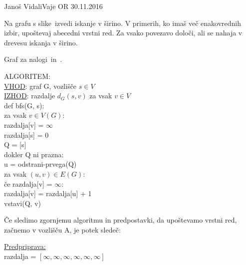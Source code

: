 
\begin{naloga}{Janoš Vidali}{Vaje OR 30.11.2016}
\begin{vprasanje}
Na grafu s slike~\fig izvedi iskanje v širino.
V primerih, ko imaš več ena\-ko\-vred\-nih izbir,
upoštevaj abecedni vrstni red.
Za vsako povezavo določi, ali se nahaja v drevesu iskanja v širino.

\begin{slika}
\pgfslika
\caption{Graf za nalogi~\nal in~\nal[dfs].}
\end{slika}
\end{vprasanje}

\begin{odgovor}
ALGORITEM:\\
\underline{VHOD}:  graf G, vozlišče $s \in V$\\
\underline{IZHOD}: razdalje $d_G(s, v)$ za vsak $v \in V$\\
def bfs(G, s):\\
	\phantom{x}\hspace{3ex}za vsak $v \in V(G)$:\\
		\phantom{x}\hspace{6ex}razdalja[v] = $\infty$\\
	\phantom{x}\hspace{3ex}razdalja[s] = 0\\
	\phantom{x}\hspace{3ex}Q = [s]\\
	\phantom{x}\hspace{3ex}dokler Q ni prazna:\\
		\phantom{x}\hspace{6ex}u = odstrani-prvega(Q)\\
		\phantom{x}\hspace{6ex}za vsak $(u, v) \in E(G)$:\\
			\phantom{x}\hspace{9ex}če razdalja[v] = $\infty$:\\
				\phantom{x}\hspace{12ex}razdalja[v] = razdalja[u] + 1\\
				\phantom{x}\hspace{12ex}vstavi(Q, v)\\
\begin{flushleft}
Če sledimo zgornjemu algoritmu in predpostavki, da upoštevamo vrstni red, začnemo v vozlišču A, je potek sledeč: 
\end{flushleft}
\underline{Predpriprava:}\\
razdalja = $[\infty, \infty, \infty, \infty, \infty, \infty]$\\

\end{odgovor}
\end{naloga}
